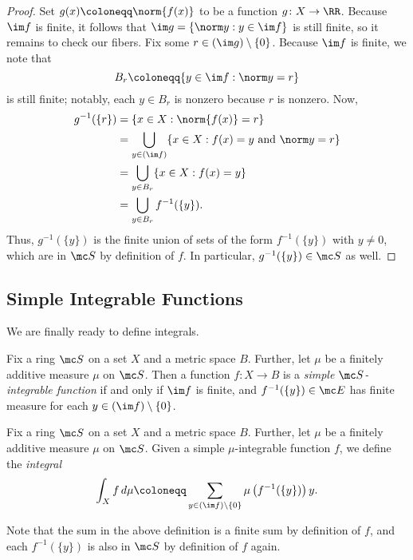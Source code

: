 \documentclass[../notes.tex]{subfiles}
\begin{document}
\begin{proof}
	Set $g(x)\coloneqq\norm{f(x)}$ to be a function $g\colon X\to\RR$. Because $\im f$ is finite, it follows that $\im g=\{\norm y:y\in\im f\}$ is still finite, so it remains to check our fibers. Fix some $r\in(\im g)\setminus\{0\}$. Because $\im f$ is finite, we note that
	\[B_r\coloneqq\{y\in\im f:\norm y=r\}\]
	is still finite; notably, each $y\in B_r$ is nonzero because $r$ is nonzero. Now,
	\begin{align*}
		g^{-1}(\{r\}) &= \{x\in X:\norm{f(x)}=r\} \\
		&= \bigcup_{y\in(\im f)}\{x\in X:f(x)=y\text{ and }\norm y=r\} \\
		&= \bigcup_{y\in B_r}\{x\in X:f(x)=y\} \\
		&= \bigcup_{y\in B_r}f^{-1}(\{y\}).
	\end{align*}
	Thus, $g^{-1}(\{y\})$ is the finite union of sets of the form $f^{-1}(\{y\})$ with $y\ne0$, which are in $\mc S$ by definition of $f$. In particular, $g^{-1}(\{y\})\in\mc S$ as well.
\end{proof}

\subsection{Simple Integrable Functions}
We are finally ready to define integrals.
\begin{definition}
	Fix a ring $\mc S$ on a set $X$ and a metric space $B$. Further, let $\mu$ be a finitely additive measure $\mu$ on $\mc S$. Then a function $f\colon X\to B$ is a \textit{simple $\mc S$-integrable function} if and only if $\im f$ is finite, and $f^{-1}(\{y\})\in\mc E$ has finite measure for each $y\in(\im f)\setminus\{0\}$.
\end{definition}
\begin{definition}[Integral]
	Fix a ring $\mc S$ on a set $X$ and a metric space $B$. Further, let $\mu$ be a finitely additive measure $\mu$ on $\mc S$. Given a simple $\mu$-integrable function $f$, we define the \textit{integral}
	\[\int_Xf\,d\mu\coloneqq\sum_{y\in(\im f)\setminus\{0\}}\mu\left(f^{-1}(\{y\})\right)y.\]
\end{definition}
Note that the sum in the above definition is a finite sum by definition of $f$, and each $f^{-1}(\{y\})$ is also in $\mc S$ by definition of $f$ again.
\end{document}
